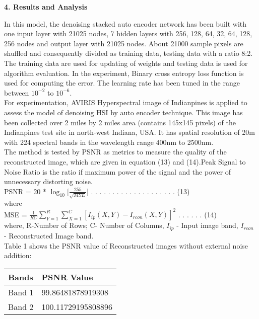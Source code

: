 \documentclass{article}
\begin{document}
\begin{flushleft}
\textbf{\large 4. Results and Analysis}
\end{flushleft}

In this model, the denoising stacked auto encoder network has been built with one input layer with 21025 nodes, 7 hidden layers with 256, 128, 64, 32, 64, 128, 256 nodes and output layer with 21025 nodes. About 21000 sample pixels are shuffled and consequently divided as training data, testing data with a ratio 8:2. The training data are used for updating of weights and testing data is used for algorithm evaluation. In the experiment, Binary cross entropy loss function is used for computing the error. The learning rate has been tuned in the range between $10^{-2}$ to $10^{-6}$. \\

For experimentation, AVIRIS Hyperspectral image of Indianpines is applied to assess the model of denoising HSI by auto encoder technique. This image has been collected over 2 miles by 2 miles area (contains 145x145 pixels) of the Indianpines test site in north-west Indiana, USA. It has spatial resolution of 20m with 224 spectral bands in the wavelength range 400nm to 2500nm.\\

The method is tested by PSNR as metrics to measure the quality of the reconstructed image, which are given in equation (13) and (14).Peak Signal to Noise Ratio is the ratio if maximum power of the signal and the power of unnecessary distorting noise.\\

PSNR = 20 * $\log_{10}{[\frac{255}{\sqrt{MSE}}}]$ . . . . . . . . . . . . . . . . . . . . (13)\\
where\\

MSE = $\frac{1}{RC}\sum_{Y=1}^R \sum_{X=1}^C [I_{ip}(X,Y) - I_{rcon}(X,Y)]^2$ . . . . . . (14)\\

where, R-Number of Rows; C- Number of Columns, $I_{ip}$ - Input image band, $I_{rcon}$ - Reconstructed Image band.\\

Table 1 shows the PSNR value of Reconstructed images without external noise addition:\\

\begin{center}
    \def\arraystretch{1.5}%
    \begin{tabular}{ | l | l |}
    \hline
        \textbf{Bands} & \textbf{PSNR Value}\\
    \hline
        Band 1  &  99.86481878919308\\
    \hline
        Band 2  &  100.11729195808896\\
    \hline
    \end{tabular}
\end{center}
\end{document}
